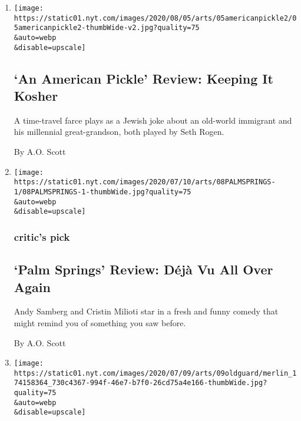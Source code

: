 \begin{enumerate}
\def\labelenumi{\arabic{enumi}.}
\item
  \href{/2020/08/04/movies/an-american-pickle-review.html}{}

  \texttt{[image: https://static01.nyt.com/images/2020/08/05/arts/05americanpickle2/05americanpickle2-thumbWide-v2.jpg?quality=75\\\&auto=webp\\\&disable=upscale]}

  \hypertarget{an-american-pickle-review-keeping-it-kosher}{%
  \subsection{`An American Pickle' Review: Keeping It
  Kosher}\label{an-american-pickle-review-keeping-it-kosher}}

  A time-travel farce plays as a Jewish joke about an old-world
  immigrant and his millennial great-grandson, both played by Seth
  Rogen.

  By A.O. Scott
\item
  \href{/2020/07/09/movies/palm-springs-review.html}{}

  \texttt{[image: https://static01.nyt.com/images/2020/07/10/arts/08PALMSPRINGS-1/08PALMSPRINGS-1-thumbWide.jpg?quality=75\\\&auto=webp\\\&disable=upscale]}

  \hypertarget{critics-pick}{%
  \subsubsection{critic's pick}\label{critics-pick}}

  \hypertarget{palm-springs-review-duxe9juxe0-vu-all-over-again}{%
  \subsection{`Palm Springs' Review: Déjà Vu All Over
  Again}\label{palm-springs-review-duxe9juxe0-vu-all-over-again}}

  Andy Samberg and Cristin Milioti star in a fresh and funny comedy that
  might remind you of something you saw before.

  By A.O. Scott
\item
  \href{/2020/07/09/movies/the-old-guard-review.html}{}

  \texttt{[image: https://static01.nyt.com/images/2020/07/09/arts/09oldguard/merlin\_174158364\_730c4367-994f-46e7-b7f0-26cd75a4e166-thumbWide.jpg?quality=75\\\&auto=webp\\\&disable=upscale]}

  \hypertarget{critics-pick-1}{%
}
\end{enumerate}
